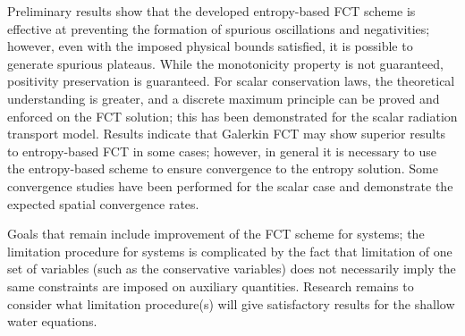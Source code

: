 Preliminary results show that the developed entropy-based FCT scheme
is effective at preventing the formation of spurious oscillations and
negativities; however, even with the imposed physical bounds satisfied, it is
possible to generate spurious plateaus. While the monotonicity property is
not guaranteed, positivity preservation is guaranteed.
For scalar conservation laws,
the theoretical understanding
is greater, and a discrete maximum principle can be proved and enforced
on the FCT solution; this has been demonstrated for the scalar radiation
transport model. Results indicate that Galerkin FCT may show superior
results to entropy-based FCT in some cases; however, in general it is
necessary to use the entropy-based scheme to ensure convergence to the
entropy solution.
Some convergence studies have been performed for the scalar case and
demonstrate the expected spatial convergence rates.

Goals that remain include improvement of the FCT scheme for systems;
the limitation procedure for systems is complicated by the fact that
limitation of one set of variables (such as the conservative variables)
does not necessarily imply the same constraints are imposed on
auxiliary quantities. Research remains to consider what limitation
procedure(s) will give satisfactory results for the shallow water
equations.
